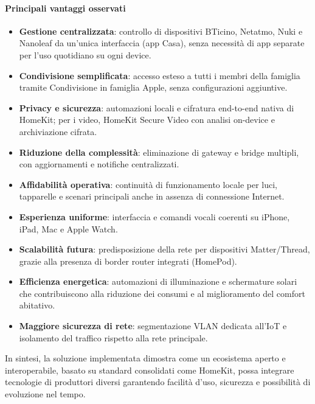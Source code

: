 \paragraph{Principali vantaggi osservati}
\begin{itemize}
  \item \textbf{Gestione centralizzata}: controllo di dispositivi BTicino, Netatmo, Nuki e Nanoleaf da un'unica interfaccia (app Casa), senza necessità di app separate per l'uso quotidiano su ogni device.
  \item \textbf{Condivisione semplificata}: accesso esteso a tutti i membri della famiglia tramite Condivisione in famiglia Apple, senza configurazioni aggiuntive.
  \item \textbf{Privacy e sicurezza}: automazioni locali e cifratura end-to-end nativa di HomeKit; per i video, HomeKit Secure Video con analisi on-device e archiviazione cifrata.
  \item \textbf{Riduzione della complessità}: eliminazione di gateway e bridge multipli, con aggiornamenti e notifiche centralizzati.
  \item \textbf{Affidabilità operativa}: continuità di funzionamento locale per luci, tapparelle e scenari principali anche in assenza di connessione Internet.
  \item \textbf{Esperienza uniforme}: interfaccia e comandi vocali coerenti su iPhone, iPad, Mac e Apple Watch.
  \item \textbf{Scalabilità futura}: predisposizione della rete per dispositivi Matter/Thread, grazie alla presenza di border router integrati (HomePod).
  \item \textbf{Efficienza energetica}: automazioni di illuminazione e schermature solari che contribuiscono alla riduzione dei consumi e al miglioramento del comfort abitativo.
  \item \textbf{Maggiore sicurezza di rete}: segmentazione VLAN dedicata all'IoT e isolamento del traffico rispetto alla rete principale.
\end{itemize}

\noindent In sintesi, la soluzione implementata dimostra come un ecosistema aperto e interoperabile, basato su standard consolidati come HomeKit, possa integrare tecnologie di produttori diversi garantendo facilità d'uso, sicurezza e possibilità di evoluzione nel tempo.